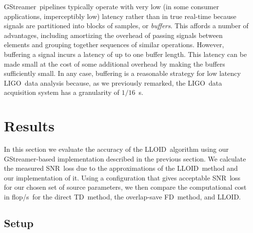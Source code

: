 \documentclass[preprint2]{aastex}
\newcommand{\LIGO}{LIGO}%
\newcommand{\SNR}{SNR}%
\newcommand{\flops}{flop/s}
\newcommand{\gstreamer}{GStreamer}
\newcommand{\lloid}{LLOID}%
\newcommand{\TD}{TD}%
\newcommand{\FD}{FD}%
\begin{document}
\gstreamer\ pipelines typically operate with very low (in some consumer
applications, imperceptibly low) latency rather than in true real-time because
signals are partitioned into blocks of samples, or \emph{buffers}.  This affords
a number of advantages, including amortizing the overhead of passing signals
between elements and grouping together sequences of similar operations.
However, buffering a signal incurs a latency of up to one buffer length.  This
latency can be made small at the cost of some additional overhead by making the
buffers sufficiently small.  In any case, buffering is a reasonable strategy for low latency \LIGO\ data analysis because, as we previously remarked, the \LIGO\ data acquisition system has a granularity of $1/16$~s.

\section{Results}

In this section we evaluate the accuracy of the \lloid\ algorithm using our 
\gstreamer{}-based implementation described in the previous section. We calculate
the measured \SNR\ loss due to the approximations of the \lloid\ method and our
implementation of it. Using a configuration that gives acceptable \SNR\ loss
for our chosen set of source parameters, we then compare the computational cost
in \flops\ for the direct \TD\ method, the overlap-save \FD\ method, and \lloid.

\subsection{Setup}
\label{sec:bank-setup}
\end{document}
